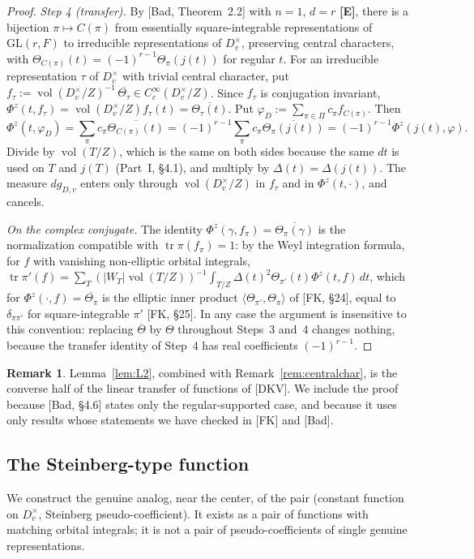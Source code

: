 \documentclass[12pt]{article}
\newcommand{\ov}[1]{\overline{#1}}
\newcommand{\tr}{\operatorname{tr}}
\newcommand{\vol}{\operatorname{vol}}
\newcommand{\GL}{\mathrm{GL}}
\newcommand{\Ev}{\textbf{[E]}}
\theoremstyle{plain}
\theoremstyle{definition}
\newtheorem{remark}[theorem]{Remark}
\begin{document}
\begin{proof}
\emph{Step 4 (transfer).} By [Bad, Theorem~2.2] with $n=1$, $d=r$ \Ev, there is a bijection $\pi\mapsto C(\pi)$ from essentially square-integrable representations of $\GL(r,F)$ to irreducible representations of $D_v^\times$, preserving central characters, with $\Theta_{C(\pi)}(t)=(-1)^{r-1}\Theta_\pi(j(t))$ for regular $t$. For an irreducible representation $\tau$ of $D_v^\times$ with trivial central character, put $f_\tau:=\vol(D_v^\times/Z)^{-1}\,\ov{\Theta_\tau}\in C_c^\infty(D_v^\times/Z)$. Since $f_\tau$ is conjugation invariant, $\Phi^z(t,f_\tau)=\vol(D_v^\times/Z)f_\tau(t)=\ov{\Theta_\tau(t)}$. Put $\varphi_D:=\sum_{\pi\in\Pi}c_\pi f_{C(\pi)}$. Then
\[ \Phi^z(t,\varphi_D)=\sum_\pi c_\pi\ov{\Theta_{C(\pi)}(t)}=(-1)^{r-1}\sum_\pi c_\pi\ov{\Theta_\pi(j(t))}=(-1)^{r-1}\Phi^z(j(t),\varphi). \]
Divide by $\vol(T/Z)$, which is the same on both sides because the same $dt$ is used on $T$ and $j(T)$ (Part~I, \S4.1), and multiply by $\Delta(t)=\Delta(j(t))$. The measure $dg_{D,v}$ enters only through $\vol(D_v^\times/Z)$ in $f_\tau$ and in $\Phi^z(t,\cdot)$, and cancels.

\emph{On the complex conjugate.} The identity $\Phi^z(\gamma,f_\pi)=\ov{\Theta_\pi(\gamma)}$ is the normalization compatible with $\tr\pi(f_\pi)=1$: by the Weyl integration formula, for $f$ with vanishing non-elliptic orbital integrals, $\tr\pi'(f)=\sum_T(|W_T|\vol(T/Z))^{-1}\int_{T/Z}\Delta(t)^2\Theta_{\pi'}(t)\Phi^z(t,f)\,dt$, which for $\Phi^z(\cdot,f)=\ov{\Theta_\pi}$ is the elliptic inner product $\langle\Theta_{\pi'},\Theta_\pi\rangle$ of [FK, \S24], equal to $\delta_{\pi\pi'}$ for square-integrable $\pi'$ [FK, \S25]. In any case the argument is insensitive to this convention: replacing $\ov{\Theta}$ by $\Theta$ throughout Steps~3 and~4 changes nothing, because the transfer identity of Step~4 has real coefficients $(-1)^{r-1}$.
\end{proof}

\begin{remark}
Lemma~\ref{lem:L2}, combined with Remark~\ref{rem:centralchar}, is the converse half of the linear transfer of functions of [DKV]. We include the proof because [Bad, \S4.6] states only the regular-supported case, and because it uses only results whose statements we have checked in [FK] and [Bad].
\end{remark}


\subsection{The Steinberg-type function}\label{subsec:steinberg}
We construct the genuine analog, near the center, of the pair (constant function on $D_v^\times$, Steinberg pseudo-coefficient). It exists as a pair of functions with matching orbital integrals; it is not a pair of pseudo-coefficients of single genuine representations.
\end{document}
